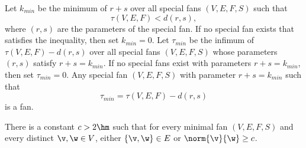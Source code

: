 \begin{definition}
Let $k_{min}$ be the minimum of $r+s$ over
all special fans $(V,E,F,S)$ such that 
\begin{equation}\label{eqn:kmin}
\tau(V,E,F) < d (r,s),
\end{equation}
where $(r,s)$ are the parameters of the special fan.  If no special
fan exists that satisfies the inequality, then set $k_{min}=0$.  Let
$\tau_{min}$ be the infimum of $\tau(V,E,F)-d(r,s)$ over all special
fans $(V,E,F,S)$ whose parameters $(r,s)$ satisfy $r+s=k_{min}$.  If
no special fans exist with parameters $r+s=k_{min}$, then set
$\tau_{min}=0$.  Any special fan $(V,E,F,S)$ with parameter
$r+s=k_{min}$ such that
\begin{displaymath}
\tau_{min}= \tau(V,E,F)-d(r,s)
\end{displaymath}
is a   fan.
\end{definition}


\begin{lemma}[]\label{lemma:c-bound}
There is a constant $c>2\hm$ such that for every minimal fan
$(V,E,F,S)$ and every distinct $\v,\w\in V$, either $\{\v,\w\}\in E$
or $\norm{\v}{\w}\ge c$.
\end{lemma}

